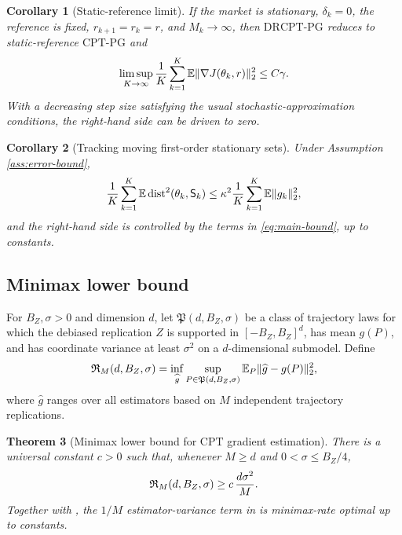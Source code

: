 \documentclass[11pt]{article}
\newtheorem{theorem}{Theorem}[section]
\newtheorem{corollary}[theorem]{Corollary}
\newcommand{\E}{\mathbb E}
\newcommand{\1}{\mathbf 1}
\newcommand{\dist}{\operatorname{dist}}
\DeclarePairedDelimiter{\norm}{\lVert}{\rVert}
\newcommand{\CPT}{\ensuremath{\mathrm{CPT}}\xspace}
\newcommand{\CPTPG}{\ensuremath{\mathrm{CPT\mbox{-}PG}}\xspace}
\newcommand{\DRCPTPG}{\ensuremath{\mathrm{DRCPT\mbox{-}PG}}\xspace}
\newcommand{\Sta}{\mathsf S}
\begin{document}
\begin{corollary}[Static-reference limit]\label{cor:static}
If the market is stationary, $\delta_k=0$, the reference is fixed, $r_{k+1}=r_k=r$, and $M_k\to\infty$, then \DRCPTPG reduces to static-reference \CPTPG and
\begin{equation}\label{eq:static-corollary}
 \limsup_{K\to\infty}{1\over K}\sum_{k=1}^{K}\E\norm{\nabla J(\theta_k,r)}_2^2\le C\gamma.
\end{equation}
With a decreasing step size satisfying the usual stochastic-approximation conditions, the right-hand side can be driven to zero.
\end{corollary}

\begin{corollary}[Tracking moving first-order stationary sets]\label{cor:set-tracking}
Under Assumption \ref{ass:error-bound},
\begin{equation}\label{eq:set-tracking}
 {1\over K}\sum_{k=1}^{K}\E\dist^2(\theta_k,\Sta_k)
 \le \kappa^2 {1\over K}\sum_{k=1}^{K}\E\norm{g_k}_2^2,
\end{equation}
and the right-hand side is controlled by the terms in \eqref{eq:main-bound}, up to constants.
\end{corollary}

\subsection{Minimax lower bound}

For $B_Z,\sigma>0$ and dimension $d$, let $\mathfrak P(d,B_Z,\sigma)$ be a class of trajectory laws for which the debiased replication $Z$ is supported in $[-B_Z,B_Z]^d$, has mean $g(P)$, and has coordinate variance at least $\sigma^2$ on a $d$-dimensional submodel.  Define
\[
 \mathfrak R_M(d,B_Z,\sigma)=
 \inf_{\widehat g}\sup_{P\in\mathfrak P(d,B_Z,\sigma)}
 \E_P\norm{\widehat g-g(P)}_2^2,
\]
where $\widehat g$ ranges over all estimators based on $M$ independent trajectory replications.

\begin{theorem}[Minimax lower bound for \CPT gradient estimation]\label{thm:minimax}
There is a universal constant $c>0$ such that, whenever $M\ge d$ and $0<\sigma\le B_Z/4$,
\begin{equation}\label{eq:minimax}
 \mathfrak R_M(d,B_Z,\sigma)
 \ge c\,{d\sigma^2\over M}.
\end{equation}
Together with , the $1/M$ estimator-variance term in  is minimax-rate optimal up to constants.
\end{theorem}
\end{document}

